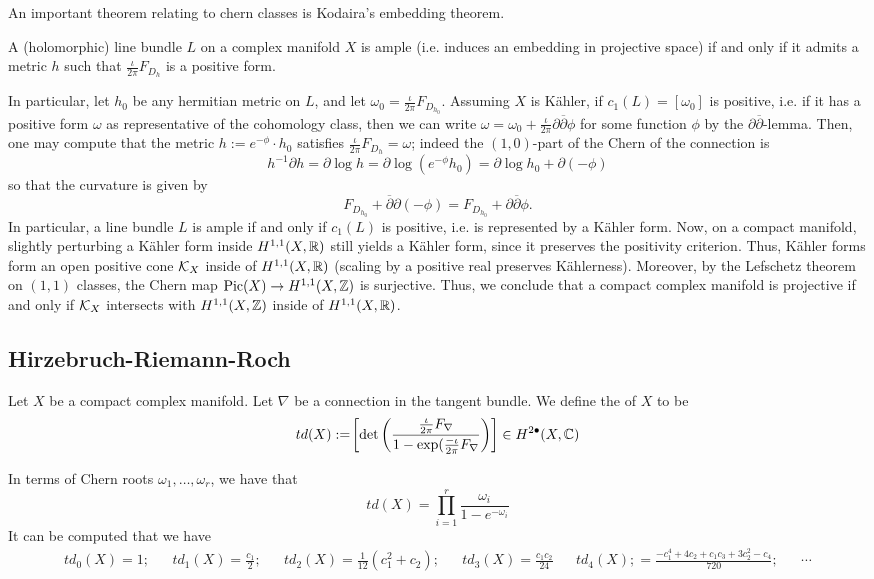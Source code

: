 An important theorem relating to chern classes is Kodaira's embedding theorem.
\begin{theorem}
	A (holomorphic) line bundle $L$ on a complex manifold $X$ is ample (i.e. induces an embedding in projective space) if and only if it admits a metric $h$ such that $\frac{\iota}{2\pi}F_{D_h}$ is a positive form.
\end{theorem}
In particular, let $h_0$ be any hermitian metric on $L$, and let $\omega_0=\frac{\iota}{2\pi}F_{D_{h_0}}$. Assuming $X$ is Kähler, if $c_1(L)=[\omega_0]$ is positive, i.e. if it has a positive form $\omega$ as representative of the cohomology class, then we can write $\omega=\omega_0+\frac{\iota}{2\pi}\partial\overline\partial\phi$ for some function $\phi$ by the $\partial\overline\partial$-lemma. Then, one may compute that the metric $h:=e^{-\phi}\cdot h_0$ satisfies $\frac{\iota}{2\pi}F_{D_h}=\omega$; indeed the $(1,0)$-part of the Chern of the connection is
\[
h^{-1}\partial h=\partial\log h=\partial\log (e^{-\phi}h_0)=\partial\log h_0+\partial (-\phi)
\]
so that the curvature is given by
\[F_{D_{h_0}}+\overline\partial\partial(-\phi)=F_{D_{h_0}}+\partial\overline\partial\phi.
\]
In particular, a line bundle $L$ is ample if and only if $c_1(L)$ is positive, i.e. is represented by a Kähler form. Now, on a compact manifold, slightly perturbing a Kähler form inside $H^{1,1}(X,\mathbb R)$ still yields a Kähler form, since it preserves the positivity criterion. Thus, Kähler forms form an open positive cone $\mathcal{K}_X$ inside of $H^{1,1}(X,\mathbb R)$ (scaling by a positive real preserves Kählerness). Moreover, by the Lefschetz theorem on $(1,1)$ classes, the Chern map $\text{Pic}(X) \to H^{1,1}(X,\mathbb Z)$ is surjective.  Thus, we conclude that a compact complex manifold is projective if and only if $\mathcal{K}_X$ intersects with $H^{1,1}(X,\mathbb Z)$ inside of $H^{1,1}(X,\mathbb R)$.
\subsection{Hirzebruch-Riemann-Roch}
\begin{definition}
	Let $X$ be a compact complex manifold. Let $\nabla$ be a connection in the tangent bundle. We define the  of $X$ to be
	\[
	td(X):=\!\left[\det\left(\frac{\frac{\iota}{2\pi}F_\nabla}{1-\exp(\frac{-\iota}{2\pi}F_\nabla}\right)\right]\in H^{2\bullet}(X,\mathbb C)
	\]
\end{definition}
In terms of Chern roots $\omega_1,\dots,\omega_r$, we have that
\[
td(X)=\prod_{i=1}^r\frac{\omega_i}{1-e^{-{\omega_i}}}\]
It can be computed that we have
\begin{align*}
	td_0(X)=1;&&td_1(X)=\frac{c_1}{2};&&td_2(X)=\frac{1}{12}(c_1^2+c_2);&& td_3(X)=\frac{c_1c_2}{24}&&td_4(X);=\frac{-c_1^4+4c_2+c_1c_3+3c_2^2-c_4}{720};&&\cdots
\end{align*}

